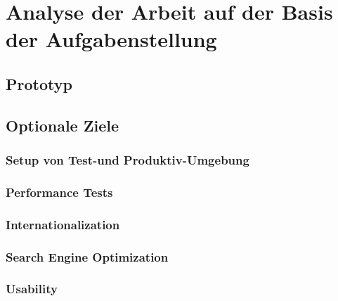 
\chapter{Analyse der Arbeit auf der Basis der Aufgabenstellung}

\section{Prototyp}

\section{Optionale Ziele}
\subsection{Setup von Test-und Produktiv-Umgebung}

\subsection{Performance Tests}

\subsection{Internationalization}

\subsection{Search Engine Optimization}

\subsection{Usability}

